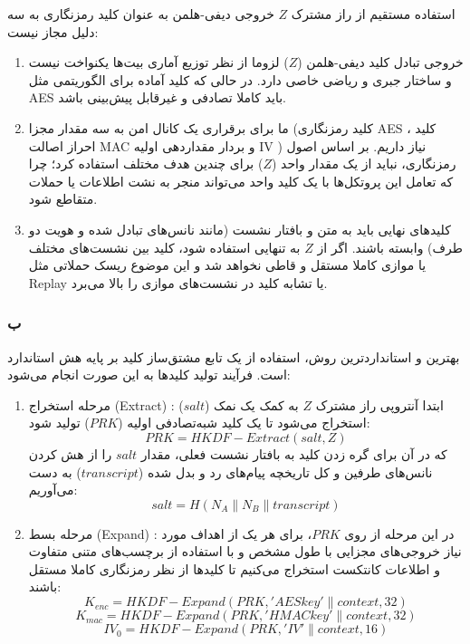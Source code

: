 استفاده مستقیم از راز مشترک $Z$ خروجی دیفی-هلمن به عنوان کلید رمزنگاری به سه دلیل مجاز نیست:
\begin{enumerate}
    \item خروجی تبادل کلید دیفی-هلمن ($Z$) لزوما از نظر توزیع آماری بیت‌ها یکنواخت نیست و ساختار جبری و ریاضی خاصی دارد. در حالی که کلید آماده برای الگوریتمی مثل AES باید کاملا تصادفی و غیرقابل پیش‌بینی باشد.
    \item  ما برای برقراری یک کانال امن به سه مقدار مجزا (کلید رمزنگاری AES ، کلید احراز اصالت MAC و بردار مقداردهی اولیه IV ) نیاز داریم. بر اساس اصول رمزنگاری، نباید از یک مقدار واحد ($Z$) برای چندین هدف مختلف استفاده کرد؛ چرا که تعامل این پروتکل‌ها با یک کلید واحد می‌تواند منجر به نشت اطلاعات یا حملات متقاطع شود.
    \item  کلیدهای نهایی باید به متن و بافتار نشست (مانند نانس‌های تبادل شده و هویت دو طرف) وابسته باشند. اگر از $Z$ به تنهایی استفاده شود، کلید بین نشست‌های مختلف یا موازی کاملا مستقل و قاطی نخواهد شد و این موضوع ریسک حملاتی مثل Replay یا تشابه کلید در نشست‌های موازی را بالا می‌برد.
\end{enumerate}


\subsubsection*{ب}

بهترین و استانداردترین روش، استفاده از یک تابع مشتق‌ساز کلید بر پایه هش استاندارد است. فرآیند تولید کلیدها به این صورت انجام می‌شود:

\begin{enumerate}
    \item {مرحله استخراج (Extract) :} ابتدا آنتروپی راز مشترک $Z$ به کمک یک نمک ($salt$) استخراج می‌شود تا یک کلید شبه‌تصادفی اولیه ($PRK$) تولید شود:
    $$PRK = HKDF-Extract(salt, Z)$$
    که در آن برای گره زدن کلید به بافتار نشست فعلی، مقدار $salt$ را از هش کردن نانس‌های طرفین و کل تاریخچه پیام‌های رد و بدل شده ($transcript$) به دست می‌آوریم:
    $$salt = H(N_A \parallel N_B \parallel transcript)$$
    
    \item {مرحله بسط (Expand) :} در این مرحله از روی $PRK$، برای هر یک از اهداف مورد نیاز خروجی‌های مجزایی با طول مشخص و با استفاده از برچسب‌های متنی متفاوت و اطلاعات کانتکست استخراج می‌کنیم تا کلیدها از نظر رمزنگاری کاملا مستقل باشند:
    $$K_{enc} = {HKDF-Expand}(PRK, {'AES key'} \parallel context, 32)$$
    $$K_{mac} = {HKDF-Expand}(PRK, {'HMAC key'} \parallel context, 32)$$
    $$IV_0 = {HKDF-Expand}(PRK, {'IV'} \parallel context, 16)$$
\end{enumerate}

